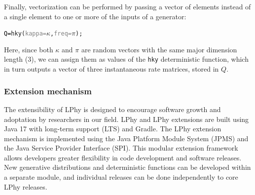 \documentclass[10pt,letterpaper,table]{article}
\theoremstyle{definition}
\begin{document}
Finally, vectorization can be performed by passing a vector of elements instead of a single element to one or more of the inputs of a generator:

{\small
\begin{alltt}
    \textcolor{black}{Q = }\textcolor{generator}{hky}(\textcolor{gray}{kappa=}\textcolor{bluishgreen}{\(\kappa\)}, \textcolor{gray}{freq=}\textcolor{bluishgreen}{\(\pi\)});
\end{alltt} 
}

Here, since both $\kappa$ and $\pi$ are random vectors with the same major dimension length (3), we can assign them as values of the \texttt{hky} deterministic function, which in turn outputs a vector of three instantaneous rate matrices, stored in $Q$.

\subsubsection{Extension mechanism}
The extensibility of LPhy is designed to encourage software growth and adoptation by researchers in our field. 
LPhy and LPhy extensions are built using Java 17 with long-term support (LTS) and Gradle. 
The LPhy extension mechanism is implemented using the Java Platform Module System (JPMS) and the Java Service Provider Interface (SPI).
This modular extension framework allows developers greater flexibility in code development and software releases. 
New generative distributions and deterministic functions can be developed within a separate module, and individual releases can be done independently to core LPhy releases. 


\end{document}
